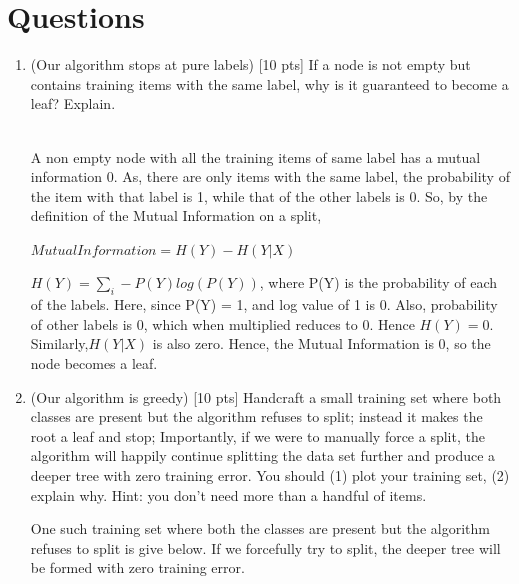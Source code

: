 \documentclass[a4paper]{article}
\theoremstyle{definition}
\newenvironment{soln}{
    \leavevmode\color{blue}\ignorespaces
}{}
\begin{document}
\section{Questions}
\begin{enumerate}
\item (Our algorithm stops at pure labels) [10 pts] If a node is not empty but contains training items with the same label, why is it guaranteed to become a leaf?  Explain.
\begin{soln}  
\\ A non empty node with all the training items of same label has a mutual information 0. As, there are only items with the same label, the probability of the item with that label is 1, while that of the other labels is 0. So, by the definition of the Mutual Information on a split, 
 
$Mutual Information = H(Y) - H(Y|X)$

$H(Y) = \sum_{i}  - P(Y)log(P(Y))$, where P(Y) is the probability of each of the labels.
Here, since P(Y) = 1, and log value of 1 is 0. Also, probability of other labels is 0, which when multiplied reduces to 0. Hence $H(Y) = 0$. Similarly,$ H(Y|X)$ is also zero. Hence, the Mutual Information is 0, so the node becomes a leaf.
\end{soln}

\item (Our algorithm is greedy)  [10 pts] Handcraft a small training set where both classes are present but the algorithm refuses to split; instead it makes the root a leaf and stop;
Importantly, if we were to manually force a split, the algorithm will happily continue splitting the data set further and produce a deeper tree with zero training error.
You should (1) plot your training set, (2) explain why.  Hint: you don't need more than a handful of items. 

\begin{soln} 
	One such training set where both the classes are present but the algorithm refuses to split is give below. If we forcefully try to split, the deeper tree will be formed with zero training error.  


\end{soln}
\end{enumerate}
\end{document}
